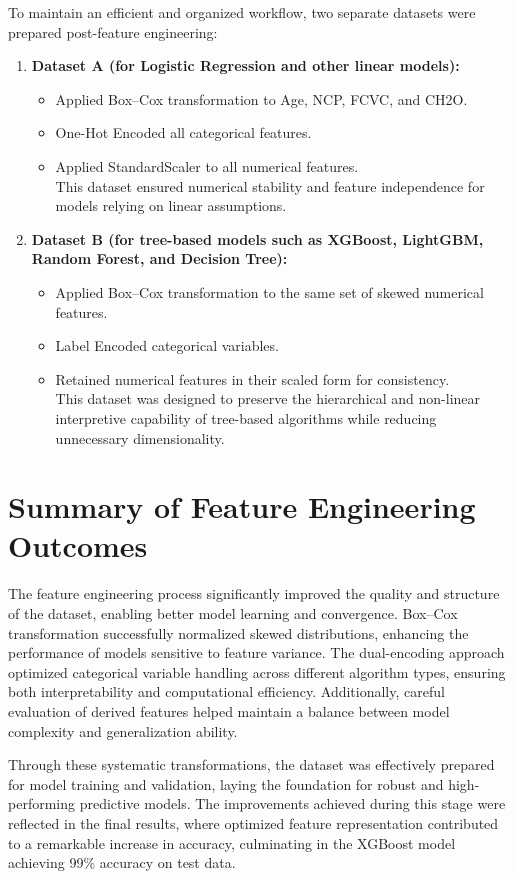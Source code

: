 To maintain an efficient and organized workflow, two separate datasets were prepared post-feature engineering:

\begin{enumerate}
    \item \textbf{Dataset A (for Logistic Regression and other linear models):}
    \begin{itemize}
        \item Applied Box–Cox transformation to Age, NCP, FCVC, and CH2O.
        \item One-Hot Encoded all categorical features.
        \item Applied StandardScaler to all numerical features. \\ This dataset ensured numerical stability and feature independence for models relying on linear assumptions.
    \end{itemize}

    \item \textbf{Dataset B (for tree-based models such as XGBoost, LightGBM, Random Forest, and Decision Tree):}
    \begin{itemize}
        \item Applied Box–Cox transformation to the same set of skewed numerical features.
        \item Label Encoded categorical variables.
        \item Retained numerical features in their scaled form for consistency. \\ This dataset was designed to preserve the hierarchical and non-linear interpretive capability of tree-based algorithms while reducing unnecessary dimensionality.
    \end{itemize}
\end{enumerate}



\section{Summary of Feature Engineering Outcomes}\label{sec:summary-of-feature-engineering-outcomes}

The feature engineering process significantly improved the quality and structure of the dataset, enabling better model learning and convergence.
Box–Cox transformation successfully normalized skewed distributions, enhancing the performance of models sensitive to feature variance.
The dual-encoding approach optimized categorical variable handling across different algorithm types, ensuring both interpretability and computational efficiency.
Additionally, careful evaluation of derived features helped maintain a balance between model complexity and generalization ability.

Through these systematic transformations, the dataset was effectively prepared for model training and validation, laying the foundation for robust and high-performing predictive models.
The improvements achieved during this stage were reflected in the final results, where optimized feature representation contributed to a remarkable increase in accuracy, culminating in the XGBoost model achieving 99\% accuracy on test data.
